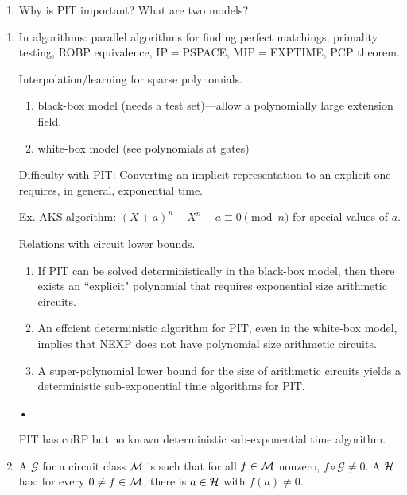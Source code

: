 \begin{enumerate}
\item
Why is PIT important? What are two models?
\end{enumerate}
\begin{enumerate}
\item
In algorithms: parallel algorithms for finding perfect matchings, primality testing, ROBP equivalence, IP$=$PSPACE, MIP$=$EXPTIME, PCP theorem. 

Interpolation/learning for sparse polynomials.
\begin{enumerate}
\item
black-box model (needs a test set)---allow a polynomially large extension field.
\item 
white-box model (see polynomials at gates)
\end{enumerate}
Difficulty with PIT: Converting an implicit representation to
an explicit one requires, in general, exponential time.

Ex. AKS algorithm: $(X+a)^n-X^n-a\equiv 0\pmod n$ for special values of $a$.

Relations with circuit lower bounds.
\begin{enumerate}
\item
If PIT can be solved
deterministically in the black-box model, then there exists an ``explicit" polynomial that requires
exponential size arithmetic circuits. 
\item
An effcient deterministic algorithm for PIT, even in the white-box model, implies that NEXP does
not have polynomial size arithmetic circuits.
\item
A super-polynomial lower bound for the size of arithmetic circuits yields a deterministic
sub-exponential time algorithms for PIT.
\end{enumerate}•

PIT has coRP but no known deterministic sub-exponential time algorithm.
\item
A  $\mathcal G$ for a circuit class $\cal M$ is such that for all $f\in \cal M$ nonzero, $f\circ \mathcal G\ne 0$. A  $\cal H$ has: for every $0\ne f\in \cal M$, there is $a\in \cal H$ with $f(a)\ne 0$.


\end{enumerate}
